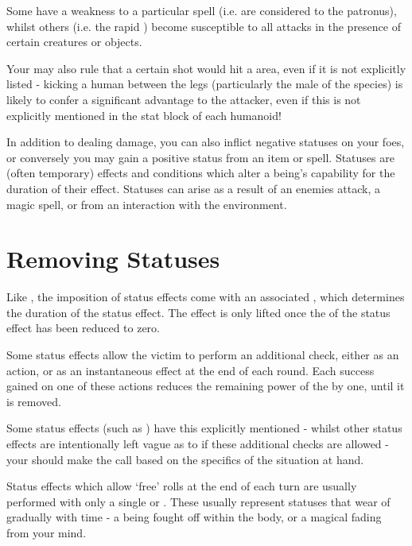 Some have a weakness to a particular spell (i.e.  are considered  to the patronus), whilst others (i.e. the rapid ) become susceptible to all attacks in the presence of certain creatures or objects. 

Your  may also rule that a certain  shot would hit a  area, even if it is not explicitly listed - kicking a human between the legs (particularly the male of the species) is likely to confer a significant advantage to the attacker, even if this is not explicitly mentioned in the stat block of each humanoid!


\label{S:Statuses}

In addition to dealing damage, you can also inflict negative statuses on your foes, or conversely you may gain a positive status from an item or spell. Statuses are (often temporary) effects and conditions which alter a being's capability for the duration of their effect. Statuses can arise as a result of an enemies attack, a magic spell, or from an interaction with the environment. 


\section{Removing Statuses}
Like , the imposition of status effects come with an associated , which determines the duration of the status effect. The effect is only lifted once the  of the status effect has been reduced to zero. 

Some status effects allow the victim to perform an additional check, either as an action, or as an instantaneous effect at the end of each round. Each success gained on one of these actions reduces the remaining power of the  by one, until it is removed. 

Some status effects (such as ) have this explicitly mentioned - whilst other status effects are intentionally left vague as to if these additional checks are allowed - your  should make the call based on the specifics of the situation at hand. 

Status effects which allow `free' rolls at the end of each turn are usually performed with only a single  or . These usually represent statuses that wear of gradually with time - a  being fought off within the body, or a magical  fading from your mind. 

